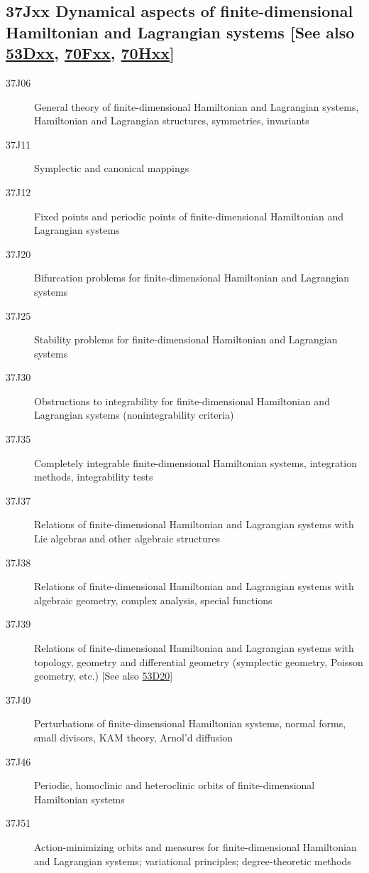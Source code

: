 \documentclass[letterpaper]{article}
\begin{document}
\subsection*{37Jxx  Dynamical  aspects of finite-dimensional Hamiltonian and  Lagrangian systems [See also \hyperref[53Dxx]{53Dxx}, \hyperref[70Fxx]{70Fxx}, \hyperref[70Hxx]{70Hxx}] }\label{37Jxx}
\begin{description} 
\item [37J06]\label{37J06} General theory of finite-dimensional Hamiltonian and Lagrangian systems, Hamiltonian and Lagrangian structures, symmetries, invariants 
\item [37J11]\label{37J11} Symplectic and canonical mappings
\item [37J12]\label{37J12} Fixed points and periodic points of finite-dimensional Hamiltonian and Lagrangian systems
\item [37J20]\label{37J20} Bifurcation problems for finite-dimensional Hamiltonian and Lagrangian systems
\item [37J25]\label{37J25} Stability problems for finite-dimensional Hamiltonian and Lagrangian systems
\item [37J30]\label{37J30} Obstructions to integrability for finite-dimensional Hamiltonian and Lagrangian systems (nonintegrability criteria)
\item [37J35]\label{37J35} Completely integrable finite-dimensional Hamiltonian systems,  integration methods, integrability tests 
\item [37J37]\label{37J37} Relations of finite-dimensional Hamiltonian and Lagrangian systems with Lie algebras and other algebraic structures 
\item [37J38]\label{37J38} Relations of finite-dimensional Hamiltonian and Lagrangian systems with algebraic geometry, complex analysis, special functions
\item [37J39]\label{37J39} Relations of finite-dimensional Hamiltonian and Lagrangian systems with topology, geometry and differential geometry (symplectic geometry, Poisson geometry, etc.) [See also \hyperref[53D20]{53D20}]
\item [37J40]\label{37J40} Perturbations of finite-dimensional Hamiltonian systems, normal forms, small divisors, KAM theory, Arnol'd diffusion
\item [37J46]\label{37J46} Periodic, homoclinic and heteroclinic orbits of finite-dimensional Hamiltonian systems 
\item [37J51]\label{37J51} Action-minimizing orbits and measures for finite-dimensional Hamiltonian and Lagrangian systems; variational principles; degree-theoretic methods

\end{description}
\end{document}
